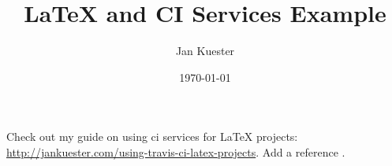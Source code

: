 \documentclass{article}
\title{LaTeX and CI Services Example}
\author{Jan Kuester}
\date{\today}
\begin{document}
\maketitle

Check out my guide on using ci services for LaTeX projects: \url{http://jankuester.com/using-travis-ci-latex-projects}. Add a reference \citep{modflow6gwf}.



\end{document}
